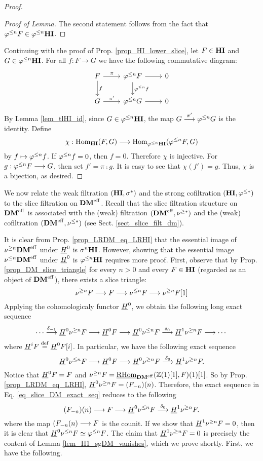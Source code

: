 \begin{proof}
\begin{proof}[Proof of Lemma]
The second statement follows from the fact that $\tlHI{n}F \in 
\tlHI{n}\HI$.
\end{proof}

Continuing with the proof of Prop. \ref{prop_HI_lower_slice}, let
$F \in \HI$ and $G \in \tlHI{n}\HI$. For all $f: F \to G$ we have 
the following commutative diagram:
\[
\begin{tikzcd}
F \arrow{r}{\pi} \arrow{d}{f}
& \tlHI{n}F \arrow{r} \arrow{d}{\tlHI{n}f}
& 0 \\
G \arrow{r}{\pi'}
& \tlHI{n}G \arrow{r}
& 0
\end{tikzcd}
\]
By Lemma \ref{lem_tlHI_id}, since $G \in \tlHI{n}\HI$, the map
$G \stackrel{\pi'}{\to} \tlHI{n}G$ is the identity. Define
\[
\chi : \homHI(F, G) \to \hom_{\tlHI{n}\HI}(\tlHI{n}F, G)
\]
by $f \mapsto \tlHI{n}f$. If $\tlHI{n}f = 0$, then $f = 0$.
Therefore $\chi$ is injective. For $g: \tlHI{n}F \to G$, then
set $f' = \pi \comp g$. It is easy to see that $\chi(f') = g$.
Thus, $\chi$ is a bijection, as desired.
\end{proof}

We now relate the weak filtration $(\HI, \sgHI{*})$ and the strong 
cofiltration $(\HI, \tlHI{*})$ to the slice filtration on 
$\DMeff$. Recall that the slice filtration structure on $\DMeff$ 
is associated with the (weak) filtration $(\DMeff, \sgDM{*})$ and 
the (weak) cofiltration $(\DMeff, \slDM{*})$ (see Sect. 
\ref{sect_slice_filt_dm}).

It is clear from Prop. \ref{prop_LRDM_eq_LRHI} that the essential 
image of $\sgDM{n}\DMeff$ under $\sheaf{H}^0$ is $\sgHI{n}\HI$. 
However, showing that the essential image $\slDM{n}\DMeff$ under 
$\sheaf{H}^0$ is $\tlHI{n}\HI$ requires more proof. 
First, observe that by Prop. \ref{prop_DM_slice_triangle} for 
every $n > 0$ and every $F \in \HI$ (regarded as an object of 
$\DMeff$), there exists a slice triangle:
\[
\sliceTriangle{n}{F}
\]
Applying the cohomologicaly functor $\sheaf{H}^0$, we obtain the
following long exact sequence
\[
\cdots \stackrel{\delta_{-1}}{\to} \sheaf{H}^0 \sgDM{n} F \to 
   \sheaf{H}^0 F \to \sheaf{H}^0 \slDM{n} F
   \stackrel{\delta_0}{\to} \sheaf{H}^1 \sgDM{n} F \to \cdots
\]
where $\sheaf{H}^i F \defeq \sheaf{H}^0F[i]$. In particular, we
have the following exact sequence
\begin{equation}\label{eq_slice_DM_exact_seq}
\sheaf{H}^0 \slDM{n} F \to \sheaf{H}^0 F \to \sheaf{H}^0 
\sgDM{n} F \stackrel{\delta_0}{\to} \sheaf{H}^1 \sgDM{n} F.
\end{equation}
Notice that $\sheaf{H}^0F = F$ and $\sgDM{n} F = \ihomDMf(\Z(1)[1], 
F)(1)[1]$. So by Prop. \ref{prop_LRDM_eq_LRHI}, $\sheaf{H}^0 
\sgDM{n}F = \LHI[n]{(\RHI[n]{F})}$. Therefore, the exact sequence
in Eq. \ref{eq_slice_DM_exact_seq} reduces to the following
\[
\LHI[n]{(\RHI[n]{F})} \to F \to \sheaf{H}^0{\slDM{n} F} 
   \stackrel{\delta_0}{\to} \sheaf{H}^1 \sgDM{n} F.
\]
where the map $\LHI[n]{(\RHI[n]{F}} \to F$ is the counit. If we 
show that $\sheaf{H}^1 \sgDM{n} F = 0$, then it is clear that
$\sheaf{H}^0 \slDM{n} F \simeq \tlHI{n} F$. The claim that 
$\sheaf{H}^1 \sgDM{n}F = 0$ is precisely the content of Lemma 
\ref{lem_H1_sgDM_vanishes}, which we prove shortly. First, we have
the following.

